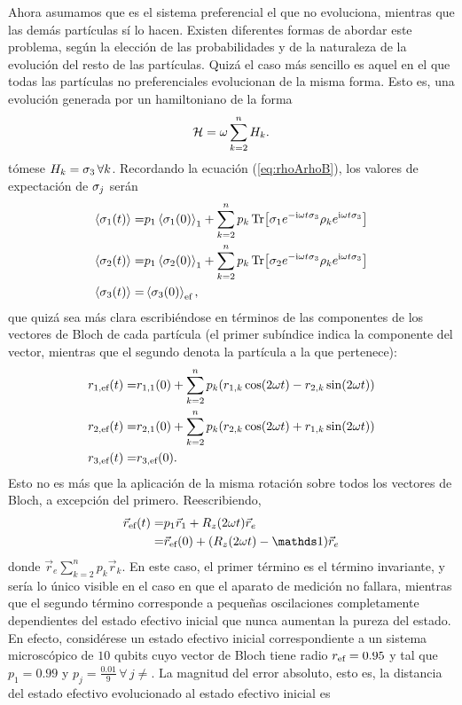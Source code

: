 Ahora asumamos que es el sistema preferencial el que no evoluciona, mientras que las demás partículas sí lo hacen. Existen diferentes formas de abordar este problema, según la elección de las probabilidades y de la naturaleza de la evolución del resto de las partículas. Quizá el caso más sencillo es aquel en el que todas las partículas no preferenciales evolucionan de la misma forma. Esto es, una evolución generada por un hamiltoniano de la forma
\begin{equation}
    \mathcal{H}=\omega \sum_{k=2}^{n}H_{k}.\nonumber
\end{equation}
 tómese $H_{k}=\sigma_{3}\,\forall k$. Recordando la ecuación (\ref{eq:rhoArhoB}), los valores de expectación de $\sigma_{j}$ serán
\begin{align}
    \expval{\sigma_{1}(t)}=&p_{1} \expval{\sigma_{1}(0)}_{1}+\sum_{k=2}^{n}p_{k}\Tr[\sigma_{1}e^{-\text{i}\omega t\sigma_{3}} \rho_{k} e^{\text{i}\omega t\sigma_{3}}]\nonumber\\
    \expval{\sigma_{2}(t)}=&p_{1} \expval{\sigma_{2}(0)}_{1}+\sum_{k=2}^{n}p_{k}\Tr[\sigma_{2}e^{-\text{i}\omega t\sigma_{3}} \rho_{k} e^{\text{i}\omega t\sigma_{3}}]\nonumber\\
    \expval{\sigma_{3}(t)}=&\expval{\sigma_{3}(0)}_{\text{ef}},\nonumber
\end{align}
que quizá sea más clara escribiéndose en términos de las componentes de los vectores de Bloch de cada partícula (el primer subíndice indica la componente del vector, mientras que el segundo denota la partícula a la que pertenece):
\begin{align}
    r_{1,\text{ef}}(t)=&r_{1,1}(0)+\sum_{k=2}^{n}p_{k}(r_{1,k}\cos(2\omega t)-r_{2,k}\sin(2\omega t))\nonumber\\
    r_{2,\text{ef}}(t)=&r_{2,1}(0)+\sum_{k=2}^{n}p_{k}(r_{2,k}\cos(2\omega t)+r_{1,k}\sin(2\omega t))\nonumber\\
    r_{3,\text{ef}}(t)=&r_{3,\text{ef}}(0).\nonumber
\end{align}
Esto no es más que la aplicación de la misma rotación sobre todos los vectores de Bloch, a excepción del primero. Reescribiendo,
\begin{align}
    \vec{r}_{\ef}(t)=&p_{1}\vec{r}_{1}+R_{z}(2\omega t)\vec{r}_{e}\nonumber\\
    =&\vec{r}_{\ef}(0)+(R_{z}(2\omega t)-\Id)\vec{r}_{e}\nonumber
\end{align}
donde $\vec{r}_{e}\sum_{k=2}^{n}p_{k}\vec{r}_{k}$.
En este caso, el primer término es el término invariante, y sería lo único visible en el caso en que el aparato de medición no fallara, mientras que el segundo término corresponde a pequeñas oscilaciones completamente dependientes del estado efectivo inicial que nunca aumentan la pureza del estado. En efecto, considérese un estado efectivo inicial correspondiente a un sistema microscópico de $10$ qubits cuyo vector de Bloch tiene radio $r_{\text{ef}}=0.95$ y tal que $p_{1}=0.99$ y $p_{j}=\frac{0.01}{9}\,\forall\,j\neq $. La magnitud del error absoluto, esto es, la distancia del estado efectivo evolucionado al estado efectivo inicial es
